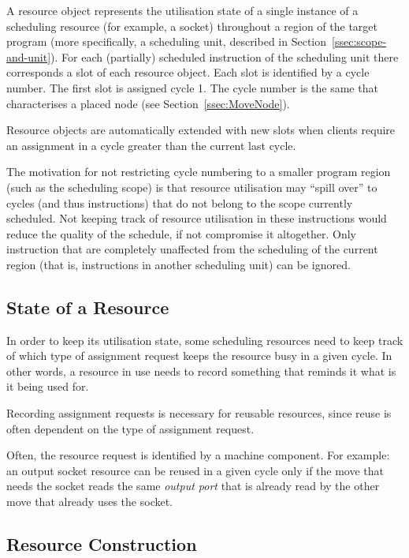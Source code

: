 \documentclass[a4paper,twoside]{tce}
\begin{document}
A resource object represents the utilisation state of a single instance of a
scheduling resource (for example, a socket) throughout a region of the
target program (more specifically, a scheduling unit, described in
Section~\ref{ssec:scope-and-unit}).
%
For each (partially) scheduled instruction of the scheduling unit there
corresponds a slot of each resource object. Each slot is identified by a
cycle number. The first slot is assigned cycle 1. The cycle number is the
same that characterises a placed node (see Section~\ref{ssec:MoveNode}).

Resource objects are automatically extended with new slots when clients
require an assignment in a cycle greater than the current last cycle.

The motivation for not restricting cycle numbering to a smaller program
region (such as the scheduling scope) is that resource utilisation may
``spill over'' to cycles (and thus instructions) that do not belong to the
scope currently scheduled. Not keeping track of resource utilisation in
these instructions would reduce the quality of the schedule, if not
compromise it altogether.
%
Only instruction that are completely unaffected from the scheduling of the
current region (that is, instructions in another scheduling unit) can be
ignored.

\subsection{State of a Resource}
\label{ssec:resource-state}

In order to keep its utilisation state, some scheduling resources need to
keep track of which type of assignment request keeps the resource busy in a
given cycle. In other words, a resource in use needs to record something
that reminds it what is it being used for.

Recording assignment requests is necessary for reusable resources, since
reuse is often dependent on the type of assignment request.

Often, the resource request is identified by a machine component. For
example: an output socket resource can be reused in a given cycle only if
the move that needs the socket reads the same \emph{output port} that is
already read by the other move that already uses the socket.

\subsection{Resource Construction}
\end{document}

